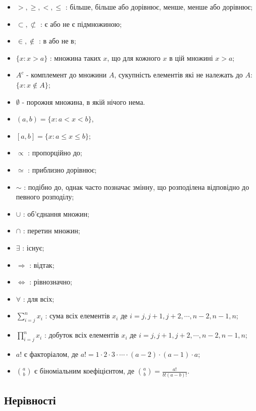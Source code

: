 \documentclass[
  11pt,
]{book}
\providecommand{\tightlist}{%
  \setlength{\itemsep}{0pt}\setlength{\parskip}{0pt}}
\begin{document}
\begin{itemize}
\tightlist
\item
  \(>, \geq, <, \leq\) : більше, більше або дорівнює, менше, менше або дорівнює;
\item
  \(\subset, \not\subset\) : є або не є підмножиною;
\item
  \(\in, \notin\) : в або не в;
\item
  \(\{x : x > a\}\) : множина таких \(x\), що для кожного \(x\) в цій множині \(x>a\);
\item
  \(A^c\) - комплемент до множини \(A\), сукупність елементів які не належать до \(A\): \(\{x: x \notin A\}\);
\item
  \(\emptyset\) - порожня множина, в якій нічого нема.
\item
  \((a, b) = \{x:a<x<b\}\),
\item
  \([a, b] = \{x:a \leq x \leq b\}\);
\item
  \(\propto\) : пропорційно до;
\item
  \(\simeq\) : приблизно дорівнює;
\item
  \(\sim\) : подібно до, однак часто позначає змінну, що розподілена відповідно до певного розподілу;
\item
  \(\cup\) : об'єднання множин;
\item
  \(\cap\) : перетин множин;
\item
  \(\exists\) : існує;
\item
  \(\Rightarrow\) : відтак;
\item
  \(\iff\) : рівнозначно;
\item
  \(\forall\) : для всіх;
\item
  \(\sum\limits_{i=j}^{n}x_i\) : сума всіх елементів \(x_i\) де \(i = j, j+1, j+2, \cdots, n-2, n-1, n\);
\item
  \(\prod\limits_{i=j}^{n}x_i\) : добуток всіх елементів \(x_i\) де \(i = j, j+1, j+2, \cdots, n-2, n-1, n\);
\item
  \(a!\) є факторіалом, де \(a! = 1 \cdot 2 \cdot 3 \cdot \cdots \cdot (a-2) \cdot (a-1) \cdot a\);
\item
  \(\binom{a}{b}\) є біноміальним коефіцієнтом, де \(\binom{a}{b} = \frac{a!}{b!(a-b)!}\).
\end{itemize}

\subsection{Нерівності}\label{ux43dux435ux440ux456ux432ux43dux43eux441ux442ux456}
\end{document}
